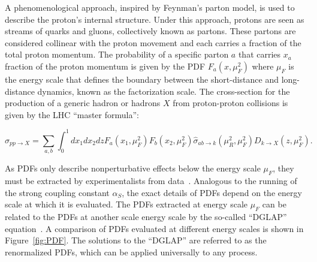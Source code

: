 A phenomenological approach, inspired by Feynman's parton model, is used to describe the proton's internal structure. Under this approach, protons are seen as streams of quarks and gluons, collectively known as partons. These partons are considered collinear with the proton movement and each carries a fraction of the total proton momentum. The probability of a specific parton $a$ that carries $x_{a}$ fraction of the proton momentum is given by the \ac{PDF} $F_{a}(x,\mu_{F}^2)$ where $\mu_{F}$ is the energy scale that defines the boundary between the short-distance and long-distance dynamics, known as the factorization scale. The cross-section for the production of a generic hadron or hadrons $X$ from proton-proton collisions is given by the \ac{LHC} ``master formula'':

\begin{equation}
\label{eq:master}
\sigma_{pp\rightarrow X}=\sum_{a,b}\int_{0}^{1}dx_{1}dx_{2}dzF_{a}(x_{1},\mu_{F}^2)F_{b}(x_{2},\mu_{F}^2)\hat{\sigma}_{ab\rightarrow k}(\mu_{R}^2,\mu_{F}^2)D_{k\rightarrow X}(z,\mu_{F}^2).
\end{equation} 

As \acp{PDF} only describe nonperturbative effects below the energy scale $\mu_{F}$, they must be extracted by experimentalists from data~\cite{NNPDF:2014otw,NNPDF:2017mvq}. Analogous to the running of the strong coupling constant $\alpha_{S}$, the exact details of \acp{PDF} depend on the energy scale at which it is evaluated. The \acp{PDF} extracted at energy scale $\mu_{F}$ can be related to the \acp{PDF} at another scale energy scale by the so-called ``DGLAP'' equation~\cite{Gribov:1971zn,Altarelli:1977zs,Dokshitzer:1977sg}. A comparison of \acp{PDF} evaluated at different energy scales is shown in Figure~\ref{fig:PDF}. The solutions to the ``DGLAP'' are referred to as the renormalized \acp{PDF}, which can be applied universally to any process. 

